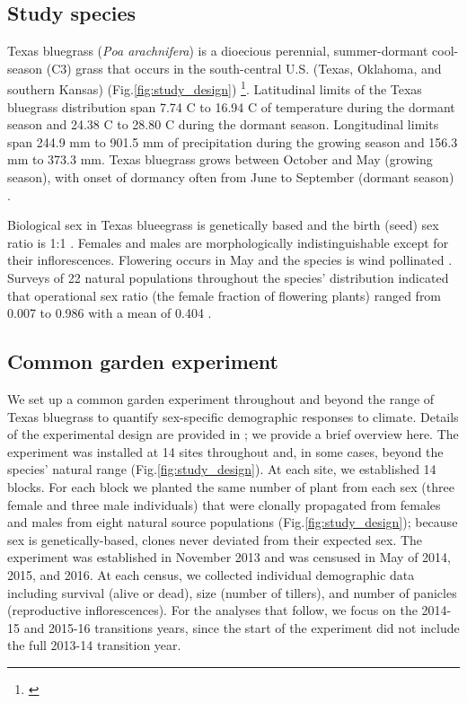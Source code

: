 \documentclass[12pt]{article}
\newcommand{\jacob}[2]{{\color{blue}{#1}}\footnote{\textit{\color{blue}{#2}}}}
\begin{document}
\subsection*{Study species}
Texas bluegrass (\textit{Poa arachnifera}) is a dioecious perennial, summer-dormant cool-season (C3) grass that occurs in the south-central U.S. (Texas, Oklahoma, and southern Kansas) (Fig.\ref{fig:study_design}) \citep{hitchcock1971manual}\jacob{}{I have updated the map}. 
Latitudinal limits of the Texas bluegrass distribution span 7.74 \degree C to 16.94 \degree C of temperature during the dormant season and 24.38 \degree C to 28.80 \degree C  during the dormant season. 
Longitudinal limits span 244.9 mm to 901.5 mm of precipitation during the growing season and 156.3 mm to 373.3 mm. 
Texas bluegrass grows between October and May (growing season), with onset of dormancy often from June to September (dormant season) \citep{kindiger2004interspecific}. 

Biological sex in Texas blueegrass is genetically based and the birth (seed) sex ratio is 1:1 \citep{renganayaki2005identification}. 
Females and males are morphologically indistinguishable except for their inflorescences. 
Flowering occurs in May and the species is wind pollinated \citep{hitchcock1971manual}. 
Surveys of 22 natural populations throughout the species' distribution indicated that operational sex ratio (the female fraction of flowering plants) ranged from 0.007 to 0.986 with a mean of 0.404 \citep{miller2022two}. 

\subsection*{Common garden experiment}
We set up a common garden experiment throughout and beyond the range of Texas bluegrass to quantify sex-specific demographic responses to climate. 
Details of the experimental design are provided in \cite{miller2022two}; we provide a brief overview here. 
The experiment was installed at 14 sites throughout and, in some cases, beyond the species' natural range (Fig.\ref{fig:study_design}).
At each site, we established 14 blocks. 
For each block we planted the same number of plant from each sex (three female and three male individuals) that were clonally propagated from females and males from eight natural source populations (Fig.\ref{fig:study_design}); because sex is genetically-based, clones never deviated from their expected sex. 
The experiment was established in November 2013 and was censused in May of 2014, 2015, and 2016. 
At each census, we collected individual demographic data including survival (alive or dead), size (number of tillers), and number of panicles (reproductive inflorescences). 
For the analyses that follow, we focus on the 2014-15 and 2015-16 transitions years, since the start of the experiment did not include the full 2013-14 transition year.
\end{document}
